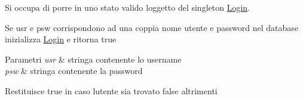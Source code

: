 Si occupa di porre in uno stato valido l\textquotesingle{}oggetto del singleton \mbox{\hyperlink{structmm_1_1model_1_1authentication_1_1_login}{Login}}. 

Se usr e psw corrispondono ad una coppia nome utente e password nel database inizializza \mbox{\hyperlink{structmm_1_1model_1_1authentication_1_1_login}{Login}} e ritorna true


\begin{DoxyParams}{Parametri}
{\em usr} & stringa contenente lo username \\
\hline
{\em psw} & stringa contenente la password \\
\hline
\end{DoxyParams}
\begin{DoxyReturn}{Restituisce}
true in caso l\textquotesingle{}utente sia trovato false altrimenti 
\end{DoxyReturn}
